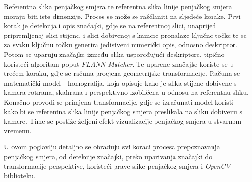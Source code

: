Referentna slika penjačkog smjera te referentna slika linije penjačkog smjera moraju biti iste dimenzije. Proces se može se raščlaniti na sljedeće korake.
Prvi korak je detekcija i opis značajki, gdje se na referentnoj slici, unaprijed pripremljenoj slici stijene, i slici dobivenoj s kamere pronalaze ključne točke te se za svaku ključnu točku generira jedistveni numerički opis, odnosno deskriptor. Potom se uparuju značajke između slika uspoređujući deskriptore, tipično koristeći algoritam poput \textit{FLANN Matcher}. 
Te uparene značajke koriste se u trećem koraku, gdje se računa procjena geometrijske transformacije. Računa se matematički model - homografija, koja opisuje kako je slika stijene dobivene s kamera rotirana, skalirana i perspektivno izobličena u odnosu na referentnu sliku. Konačno provodi se primjena transformacije, gdje se izračunati model koristi kako bi se referentna slika linije penjačkog smjera preslikala na sliku dobivenu s kamere. Time se postiže željeni efekt vizualizacije penjačkog smjera u stvarnom vremenu.

U ovom poglavlju detaljno se obrađuju svi koraci procesa prepoznavanja penjačkog smjera, od detekcije značajki, preko uparivanja značajki do transformacije perspektive, koristeći prave slike penjačkog smjera i \textit{OpenCV} biblioteku.



